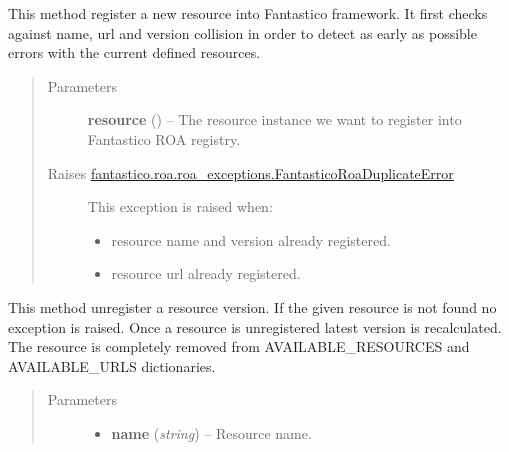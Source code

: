 \documentclass[letterpaper,10pt,english]{sphinxmanual}
\begin{document}
\begin{fulllineitems}

\begin{fulllineitems}
\label{features/roa/technical_summary:fantastico.roa.resources_registry.ResourcesRegistry.register_resource}
This method register a new resource into Fantastico framework. It first checks against name, url and version collision
in order to detect as early as possible errors with the current defined resources.
\begin{quote}\begin{description}
\item[{Parameters}] \leavevmode
\textbf{resource} ({\hyperref[features/roa/technical_summary:fantastico.roa.resource_decorator.Resource]{}}) -- The resource instance we want to register into Fantastico ROA registry.

\item[{Raises {\hyperref[features/roa/technical_summary:fantastico.roa.roa_exceptions.FantasticoRoaDuplicateError]{fantastico.roa.roa\_exceptions.FantasticoRoaDuplicateError}}}] \leavevmode

This exception is raised when:
\begin{itemize}
\item {} 
resource name and version already registered.

\item {} 
resource url already registered.

\end{itemize}


\end{description}\end{quote}

\end{fulllineitems}


\begin{fulllineitems}
\label{features/roa/technical_summary:fantastico.roa.resources_registry.ResourcesRegistry.unregister_resource}
This method unregister a resource version. If the given resource is not found no exception is raised. Once a resource
is unregistered latest version is recalculated. The resource is completely removed from AVAILABLE\_RESOURCES and
AVAILABLE\_URLS dictionaries.
\begin{quote}\begin{description}
\item[{Parameters}] \leavevmode\begin{itemize}
\item {} 
\textbf{name} (\emph{string}) -- Resource name.


\end{itemize}
\end{description}
\end{quote}
\end{fulllineitems}
\end{fulllineitems}
\end{document}
